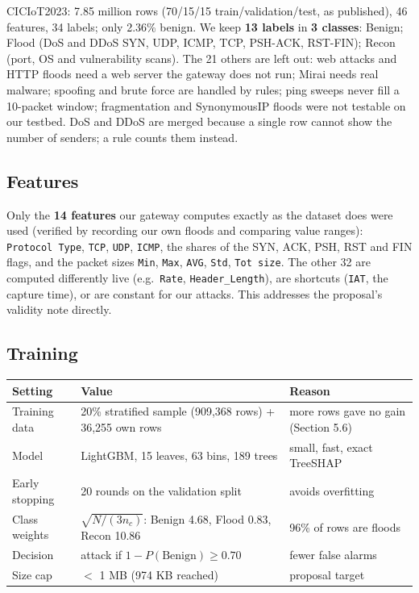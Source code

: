 \documentclass[11pt,a4paper]{article}
\newcommand{\file}[1]{\texttt{\small #1}}
\begin{document}
CICIoT2023: 7.85 million rows (70/15/15 train/validation/test, as published), 46 features, 34 labels; only 2.36\%
benign. We keep \textbf{13 labels} in \textbf{3 classes}: Benign; Flood (DoS and DDoS SYN, UDP, ICMP, TCP, PSH-ACK,
RST-FIN); Recon (port, OS and vulnerability scans). The 21 others are left out: web attacks and HTTP floods need a
web server the gateway does not run; Mirai needs real malware; spoofing and brute force are handled by rules;
ping sweeps never fill a 10-packet window; fragmentation and SynonymousIP floods were not testable on our testbed.
DoS and DDoS are merged because a single row cannot show the number of senders; a rule counts them instead.

\subsection{Features}

Only the \textbf{14 features} our gateway computes exactly as the dataset does were used (verified by recording our
own floods and comparing value ranges): \file{Protocol Type}, \file{TCP}, \file{UDP}, \file{ICMP}, the shares of
the SYN, ACK, PSH, RST and FIN flags, and the packet sizes \file{Min}, \file{Max}, \file{AVG}, \file{Std},
\file{Tot size}. The other 32 are computed differently live (e.g.\ \file{Rate}, \file{Header\_Length}), are
shortcuts (\file{IAT}, the capture time), or are constant for our attacks. This addresses the proposal's validity
note directly.

\subsection{Training}

\begin{center}
\small
\begin{tabularx}{\linewidth}{P{3.4cm}P{5.2cm}L}
\toprule
Setting & Value & Reason \\
\midrule
Training data & 20\% stratified sample (909,368 rows) + 36,255 own rows & more rows gave no gain (Section 5.6) \\
Model & LightGBM, 15 leaves, 63 bins, 189 trees & small, fast, exact TreeSHAP \\
Early stopping & 20 rounds on the validation split & avoids overfitting \\
Class weights & $\sqrt{N / (3 n_c)}$: Benign 4.68, Flood 0.83, Recon 10.86 & 96\% of rows are floods \\
Decision & attack if $1 - P(\text{Benign}) \geq 0.70$ & fewer false alarms \\
Size cap & $<$ 1 MB (974 KB reached) & proposal target \\
\bottomrule
\end{tabularx}
\end{center}
\end{document}
